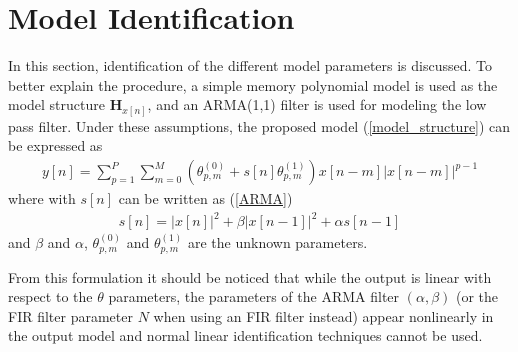 \documentclass[journal]{IEEEtran}
\begin{document}
\section{Model Identification}
In this section, identification of the different model parameters is discussed. To better explain the procedure, a simple memory polynomial model \cite{kim} is used as the model structure $\mathbf{H}_{x[n]}$, and an ARMA(1,1) filter is used for modeling the low pass filter. Under these assumptions, the proposed model (\ref{model_structure}) can be expressed as
\begin{align}
y[n] = \sum_{p=1}^P\sum_{m=0}^M \left(\theta_{p,m}^{(0)} + s[n]\theta_{p,m}^{(1)}\right)x[n-m]\left|x[n-m]\right|^{p-1} \label{model_structure_mp}
\end{align}
where with $s[n]$ can be written as (\ref{ARMA})
\begin{align}
s[n] = |x[n]|^2 + \beta |x[n-1]|^2 + \alpha s[n-1]
\label{ARMA_mp}
\end{align}
and $\beta$ and $\alpha$, $\theta_{p,m}^{(0)}$ and $\theta_{p,m}^{(1)}$ are the unknown parameters.

From this formulation it should be noticed that while the output is linear with respect to the $\theta$ parameters, 
the parameters of the ARMA filter $(\alpha,\beta)$ (or the FIR filter parameter $N$ when using an FIR filter instead) 
appear nonlinearly in the output model and normal linear identification techniques cannot be used.
\end{document}
